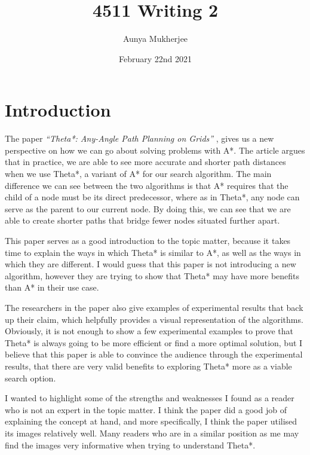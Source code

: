 \documentclass{article}
\title{4511 Writing 2}
\author{Aunya Mukherjee }
\date{February 22nd 2021}
\begin{document}
\maketitle

\section{Introduction}
The paper {\it“Theta*: Any-Angle Path Planning on Grids”} \citep{theta*}, gives us a new perspective on how we can go about solving problems with A*. The article argues that in practice, we are able to see more accurate and shorter path distances when we use Theta*, a variant of A* for our search algorithm. The main difference we can see between the two algorithms is that A* requires that the child of a node must be its direct predecessor, where as in Theta*, any node can serve as the parent to our current node. By doing this, we can see that we are able to create shorter paths that bridge fewer nodes situated further apart. 

\bigskip

This paper serves as a good introduction to the topic matter, because it takes time to explain the ways in which Theta* is similar to A*, as well as the ways in which they are different. I would guess that this paper is not introducing a new algorithm, however they are trying to show that Theta* may have more benefits than A* in their use case.

\bigskip

The researchers in the paper also give examples of experimental results that back up their claim, which helpfully provides a visual representation of the algorithms. Obviously, it is not enough to show a few experimental examples to prove that Theta* is always going to be more efficient or find a more optimal solution, but I believe that this paper is able to convince the audience through the experimental results, that there are very valid benefits to exploring Theta* more as a viable search option. 

\bigskip

I wanted to highlight some of the strengths and weaknesses I found as a reader who is not an expert in the topic matter. I think the paper did a good job of explaining the concept at hand, and more specifically, I think the paper utilised its images relatively well. Many readers who are in a similar position as me may find the images very informative when trying to understand Theta*.

\bigskip
\end{document}
